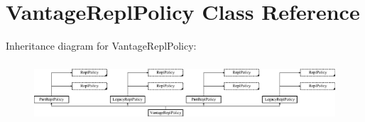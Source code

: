 \hypertarget{classVantageReplPolicy}{\section{Vantage\-Repl\-Policy Class Reference}
\label{classVantageReplPolicy}
}
Inheritance diagram for Vantage\-Repl\-Policy\-:\begin{figure}[H]
\begin{center}
\leavevmode
\includegraphics[height=2.204725cm]{classVantageReplPolicy}
\end{center}
\end{figure}
